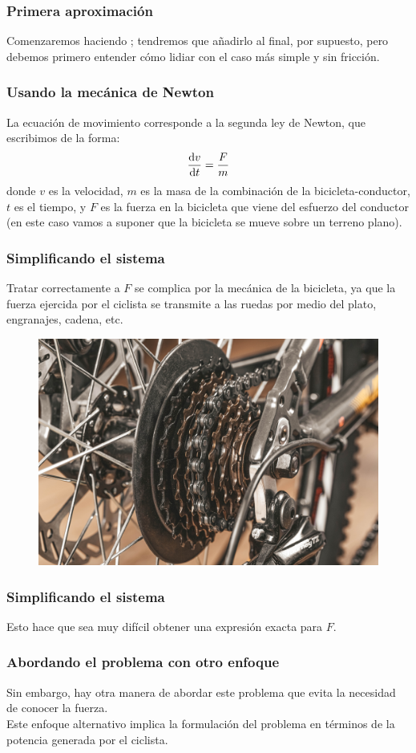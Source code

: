 \documentclass[12pt]{beamer}
\begin{document}
\begin{frame}
\frametitle{Primera aproximación}
Comenzaremos haciendo ; \pause tendremos que añadirlo al final, por supuesto, pero debemos primero entender cómo lidiar con el caso más simple y sin fricción.
\end{frame}
\begin{frame}
\frametitle{Usando la mecánica de Newton}
La ecuación de movimiento corresponde a la segunda ley de Newton, que escribimos de la forma:
\pause
\begin{equation}
\dv{v}{t} = \dfrac{F}{m}
\label{EqNewton2}
\end{equation}
donde $v$ es la velocidad, $m$ es la masa de la combinación de la bicicleta-conductor, $t$ es el tiempo, y $F$ es la fuerza en la bicicleta que viene del esfuerzo del conductor (en este caso vamos a suponer que la bicicleta se mueve sobre un terreno plano).
\end{frame}
\begin{frame}
\frametitle{Simplificando el sistema}
Tratar correctamente a $F$ se complica por la mecánica de la bicicleta, \pause ya que la fuerza ejercida por el ciclista se transmite a las ruedas por medio del plato, engranajes, cadena, etc.
\begin{figure}
    \centering
    \includegraphics[scale=0.1]{Imagenes/Bicicleta_Engranes.jpg}
\end{figure}
\end{frame}
\begin{frame}
\frametitle{Simplificando el sistema}
Esto hace que sea muy difícil obtener una expresión exacta para $F$.
\end{frame}
\begin{frame}
\frametitle{Abordando el problema con otro enfoque}
Sin embargo, hay otra manera de abordar este problema que evita la necesidad de conocer la fuerza.
\\
\bigskip
\pause
Este enfoque alternativo implica la formulación del problema en términos de la potencia generada por el ciclista.
\end{frame}
\end{document}
